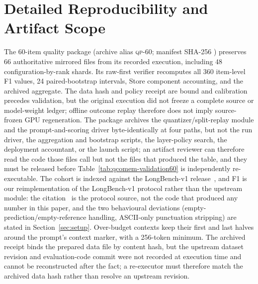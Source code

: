 \documentclass{article}
\begin{document}



\appendix

\section{Detailed Reproducibility and Artifact Scope}
\label{app:reproducibility}

The 60-item quality package (archive alias \textsc{qp-60}; manifest SHA-256
)
preserves 66 authoritative mirrored files from its recorded execution,
including 48 configuration-by-rank shards.  Its
raw-first verifier recomputes all 360 item-level F1 values, 24 paired-bootstrap
intervals, Store component accounting, and the archived aggregate.  The data
hash and policy receipt are bound and calibration precedes validation, but the
original execution did not freeze a complete source or model-weight ledger;
offline outcome replay therefore does not imply source-frozen GPU
regeneration.  The package archives the quantizer/split-replay module and the
prompt-and-scoring driver byte-identically at four paths, but not the run
driver, the aggregation and bootstrap scripts, the layer-policy search, the
deployment accountant, or the launch script; an artifact reviewer can therefore
read the code those files call but not the files that produced the table, and
they must be released before Table~\ref{tab:qcomem-validation60} is
independently re-executable.  The cohort is indexed against the LongBench-v1
release~\citep{bai2024longbenchrelease}, and F1 is our reimplementation of the
LongBench-v1  protocol rather than the upstream module: the
citation~\citep{bai2024longbenchcode} is the protocol source, not the code that
produced any number in this paper, and the two behavioural deviations
(empty-prediction/empty-reference handling, ASCII-only punctuation stripping)
are stated in Section~\ref{sec:setup}.  Over-budget contexts keep their first
and last halves around the prompt's context marker, with a 256-token minimum.  The
archived receipt binds the prepared data file by content hash, but the upstream
dataset revision and evaluation-code commit were not recorded at execution time
and cannot be reconstructed after the fact; a re-executor must therefore match
the archived data hash rather than resolve an upstream revision.
\end{document}
